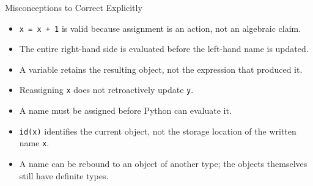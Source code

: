 \documentclass[aspectratio=169,10pt]{beamer}
\begin{document}
\begin{frame}{Misconceptions to Correct Explicitly}

  \begin{itemize}

    \item \texttt{x = x + 1} is valid because assignment is an action, not an algebraic claim.

    \item The entire right-hand side is evaluated before the left-hand name is updated.

    \item A variable retains the resulting object, not the expression that produced it.

    \item Reassigning \texttt{x} does not retroactively update \texttt{y}.

    \item A name must be assigned before Python can evaluate it.

    \item \texttt{id(x)} identifies the current object, not the storage location of the written name \texttt{x}.

    \item A name can be rebound to an object of another type; the objects themselves still have definite types.

  \end{itemize}

\end{frame}
\end{document}
